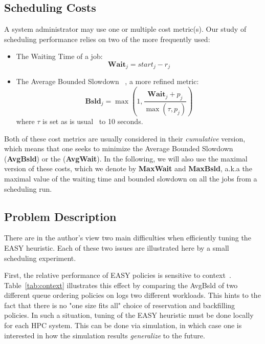 \subsection{Scheduling Costs}
\label{sub:scheduling_objectives}

A system administrator may use one or multiple cost metric(s). Our study of
scheduling performance relies on two of the more frequently used:

\begin{itemize}
  \item The Waiting Time of a job:
    \begin{equation}
      \textbf{Wait}_j =  start_j-r_j
    \end{equation}
  \item The Average Bounded Slowdown~\cite{frachtenberg2005pitfalls,feitelson1998metrics} , a more refined metric:
    \begin{equation}
      \textbf{Bsld}_j = \max \left(  1,\frac{\textbf{Wait}_j + p_j}{\max \left( \tau,p_j \right) } \right)
    \end{equation}
    where $\tau$ is set as is usual~\cite{feitelson1998metrics} to 10 seconds.
\end{itemize}

Both of these cost metrics are usually considered in their \textit{cumulative}
version, which means that one seeks to minimize the Average Bounded Slowdown
(\textbf{AvgBsld}) or the (\textbf{AvgWait}). In the following, we will also
use the maximal version of these costs, which we denote by \textbf{MaxWait} and
\textbf{MaxBsld}, a.k.a the maximal value of the waiting time and bounded
slowdown on all the jobs from a scheduling run.

\subsection{Problem Description}
\label{sec:minmax}

There are in the author's view two main difficulties when efficiently tuning the
EASY heuristic. Each of these two issues are illustrated here by a small
scheduling experiment.

First, the relative performance of EASY policies is sensitive to
context~\cite{variability,bfchar}. Table~\ref{tab:context} illustrates this
effect by comparing the AvgBsld of two different queue ordering policies on
logs two different workloads. This hints to the fact that there is no "one size
fits all" choice of reservation and backfilling policies.  In such a situation,
tuning of the EASY heuristic must be done locally for each HPC system. This can
be done via simulation, in which case one is interested in how the simulation
results \textit{generalize} to the future.

